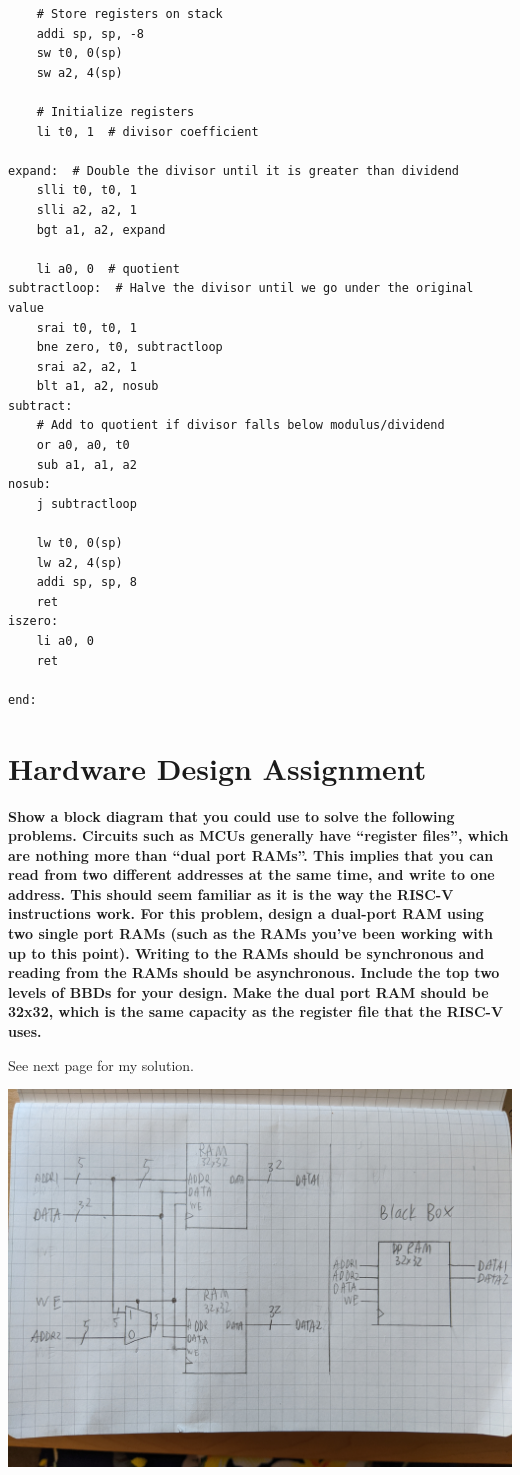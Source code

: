 \documentclass{article}
\begin{document}
\begin{verbatim}
    # Store registers on stack
    addi sp, sp, -8
    sw t0, 0(sp)
    sw a2, 4(sp)

    # Initialize registers
    li t0, 1  # divisor coefficient

expand:  # Double the divisor until it is greater than dividend
    slli t0, t0, 1
    slli a2, a2, 1
    bgt a1, a2, expand

    li a0, 0  # quotient
subtractloop:  # Halve the divisor until we go under the original value
    srai t0, t0, 1
    bne zero, t0, subtractloop
    srai a2, a2, 1
    blt a1, a2, nosub
subtract:
    # Add to quotient if divisor falls below modulus/dividend
    or a0, a0, t0
    sub a1, a1, a2
nosub:
    j subtractloop

    lw t0, 0(sp)
    lw a2, 4(sp)
    addi sp, sp, 8
    ret
iszero:
    li a0, 0
    ret

end:
\end{verbatim}

\section{Hardware Design Assignment}
\textbf{Show a block diagram that you could use to solve the following problems. Circuits such as MCUs generally have “register files”, which are nothing more than “dual port RAMs”. This implies that you can read from two different addresses at the same time, and write to one address. This should seem familiar as it is the way the RISC-V instructions work. For this problem, design a dual-port RAM using two single port RAMs (such as the RAMs you’ve been working with up to this point). Writing to the RAMs should be synchronous and reading from the RAMs should be asynchronous. Include the top two levels of BBDs for your design. Make the dual port RAM should be 32x32, which is the same capacity as the register file that the RISC-V uses. }

See next page for my solution.

\begin{landscape}
\centering
\includegraphics[width=0.95\linewidth]{hw.jpg}
    
\end{landscape}
\end{document}
